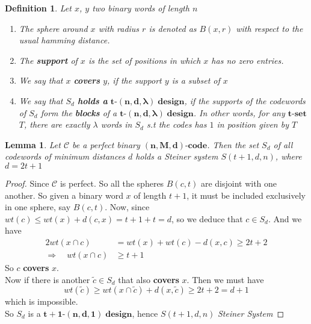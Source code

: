 \documentclass{article}
\newtheorem{lemma}[theorem]{Lemma}
\newtheorem{definition}[theorem]{Definition}
\numberwithin{equation}{theorem}
\newcommand{\tParamDesign}[4]{\ensuremath{\bm{#1\mbox{-}(#2,#3,#4)\; design}}}
\newcommand{\steinerSystem}[3]{\ensuremath{{S(#1,#2,#3)}}}
\newcommand{\pluralMyBlock}{\textbf{blocks}}
\newcommand{\cCodes}{\ensuremath{\mathscr{C}}}
\newcommand{\tSet}[1]{\ensuremath{\bm{#1\mbox{-}{set}}}}
\newcommand{\code}[3]{\ensuremath{\bm{(#1,#2,#3)\mbox{-}code}}}
\begin{document}
\begin{definition}
	Let $x$, $y$ two binary words of length $n$
	\begin{enumerate}
		\item The sphere around $x$ with radius $r$ is denoted as $B(x,r)$ with respect to the usual hamming distance.
		\item The \textbf{support} of $x$ is the set of positions in which $x$ has no zero entries.
		\item We say that $x$ \textbf{covers} $y$, if the support $y$ is a subset of $x$
		\item We say that $S_d$ \textbf{holds a } {\tParamDesign{t}{n}{d}{\lambda}}, if the supports of the codewords of $S_d$ form the {\pluralMyBlock} of a {\tParamDesign{t}{n}{d}{\lambda}}. In other words, for any {\tSet{t}} $T$, there are exactly $\lambda$ words in $S_d$ s.t the codes has $1$ in position given by $T$
	\end{enumerate}
\end{definition}

\begin{lemma}\label{perfectCdDesign}
Let {\cCodes} be a perfect binary {\code{n}{M}{d}}. Then the set $S_d$ of all codewords of minimum distances $d$ holds a \emph{Steiner system} \steinerSystem{t+1}{d}{n}, where $d = 2t + 1$
\end{lemma}

\begin{proof}
Since {\cCodes} is perfect. So all the spheres $B(c,t)$ are disjoint with one another. So given a binary word $x$ of length $t+1$, it must be included exclusively in one sphere, say $B(c,t)$. Now, since $wt(c) \leq wt(x) + d(c,x) = t + 1 + t = d$, so we deduce that $c \in S_d$. And we have
\begin{align*}
	2wt(x \cap c) &= wt(x) + wt(c) - d(x,c) \geq 2t+2 \\
	\Rightarrow \quad wt(x\cap c) &\geq t + 1
\end{align*}
So $c$ \textbf{covers} $x$. \\
Now if there is another $\tilde{c} \in S_d$ that also \textbf{covers} $x$. Then we must have 
\[
	wt(\tilde{c}) \geq wt(x\cap \tilde{c}) + d(x,\tilde{c}) \geq 2t + 2 = d + 1
\]
 which is impossible. \\
So $S_d$ is a \tParamDesign{t+1}{n}{d}{1}, hence \steinerSystem{t+1}{d}{n} \emph{Steiner System}
\end{proof}
\end{document}
